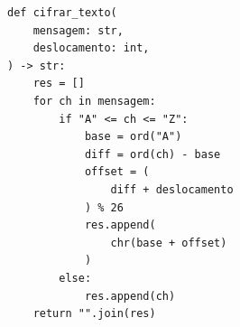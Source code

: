 \ifmostrarGabarito
\begin{verbatim}
def cifrar_texto(
    mensagem: str,
    deslocamento: int,
) -> str:
    res = []
    for ch in mensagem:
        if "A" <= ch <= "Z":
            base = ord("A")
            diff = ord(ch) - base
            offset = (
                diff + deslocamento
            ) % 26
            res.append(
                chr(base + offset)
            )
        else:
            res.append(ch)
    return "".join(res)
\end{verbatim}

\fi
